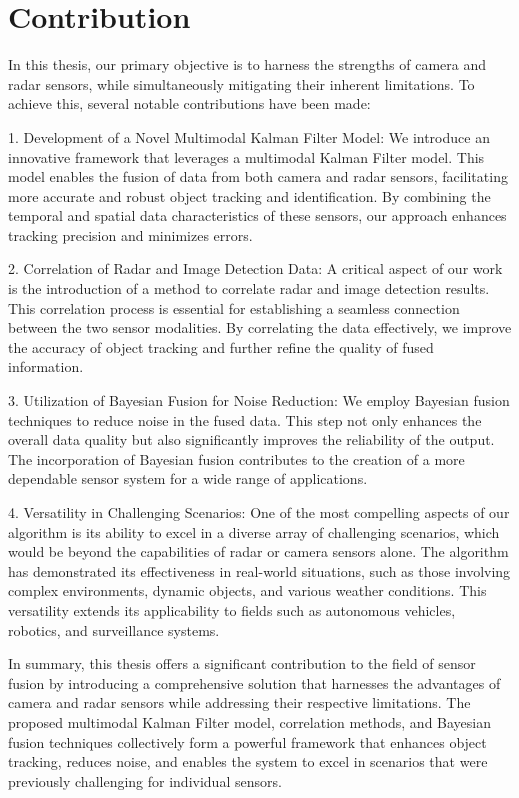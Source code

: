 \section{Contribution}\label{sec:1-contribution}


In this thesis, our primary objective is to harness the strengths of camera and radar sensors, while simultaneously mitigating their inherent limitations. To achieve this, several notable contributions have been made:

1. Development of a Novel Multimodal Kalman Filter Model: 
We introduce an innovative framework that leverages a multimodal Kalman Filter model. This model enables the fusion of data from both camera and radar sensors, facilitating more accurate and robust object tracking and identification. By combining the temporal and spatial data characteristics of these sensors, our approach enhances tracking precision and minimizes errors.

2. Correlation of Radar and Image Detection Data: 
A critical aspect of our work is the introduction of a method to correlate radar and image detection results. 
This correlation process is essential for establishing a seamless connection between the two sensor modalities.
By correlating the data effectively, we improve the accuracy of object tracking and further refine the quality of fused information.

3. Utilization of Bayesian Fusion for Noise Reduction: 
We employ Bayesian fusion techniques to reduce noise in the fused data.
This step not only enhances the overall data quality but also significantly improves the reliability of the output. 
The incorporation of Bayesian fusion contributes to the creation of a more dependable sensor system for a wide range of applications.

4. Versatility in Challenging Scenarios: 
One of the most compelling aspects of our algorithm is its ability to excel in a diverse array of challenging scenarios,
 which would be beyond the capabilities of radar or camera sensors alone. The algorithm has demonstrated its effectiveness in real-world situations, 
 such as those involving complex environments, dynamic objects, and various weather conditions. This versatility extends its applicability to fields such as autonomous vehicles,
  robotics, and surveillance systems.

In summary, this thesis offers a significant contribution to the field of sensor fusion by introducing a comprehensive solution 
that harnesses the advantages of camera and radar sensors while addressing their respective limitations.
 The proposed multimodal Kalman Filter model, correlation methods, and Bayesian fusion techniques collectively form 
 a powerful framework that enhances object tracking, reduces noise, and enables the system to excel in scenarios that were previously challenging for individual sensors.



